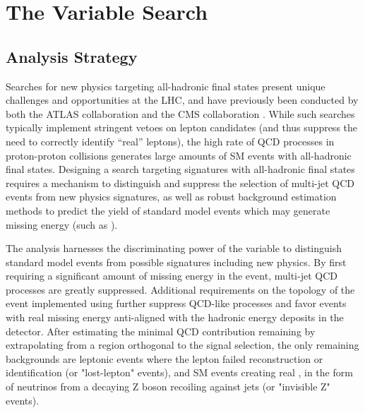 \chapter{The \texorpdfstring{\mttwo} VVariable Search}
\label{ch:analysis}

\section{Analysis Strategy}
\label{sec:strategy}
Searches for new physics targeting all-hadronic final states present unique challenges and opportunities at the LHC, and have previously been conducted by both the ATLAS collaboration \cite{Aad:2016jxj,Aaboud:2016tnv,Aaboud:2016zdn,Aad:2016eki,Aaboud:2016nwl,Khachatryan:2016epu} and the CMS collaboration \cite{Khachatryan:2016xvy,Khachatryan:2016kdk,Khachatryan:2016dvc}. While such searches typically implement stringent vetoes on lepton candidates (and thus suppress the need to correctly identify ``real'' leptons), the high rate of QCD processes in proton-proton collisions generates large amounts of SM events with all-hadronic final states. Designing a search targeting signatures with all-hadronic final states requires a mechanism to distinguish and suppress the selection of multi-jet QCD events from new physics signatures, as well as robust background estimation methods to predict the yield of standard model events which may generate missing energy (such as \znunu).

The \mttwo analysis harnesses the discriminating power of the \mttwo variable to distinguish standard model events from possible signatures including new physics. By first requiring a significant amount of missing energy in the event, multi-jet QCD processes are greatly suppressed. Additional requirements on the topology of the event implemented using \mttwo further suppress QCD-like processes and favor events with real missing energy anti-aligned with the hadronic energy deposits in the detector. After estimating the minimal QCD contribution remaining by extrapolating from a region orthogonal to the signal selection, the only remaining backgrounds are leptonic events where the lepton failed reconstruction or identification (or "lost-lepton" events), and SM events creating real \MET, in the form of neutrinos from a decaying Z boson recoiling against jets (or "invisible Z" events).

